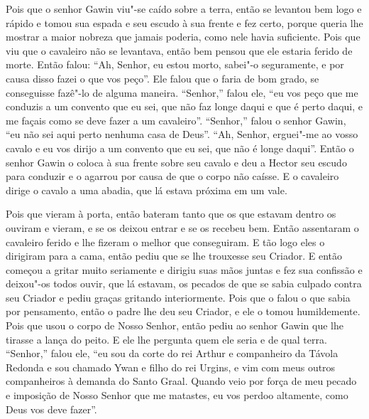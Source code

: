 Pois que o senhor Gawin viu"-se caído sobre a terra, então se levantou bem logo e
rápido e tomou sua espada e seu escudo à sua frente e fez certo, porque queria
lhe mostrar a maior nobreza que jamais poderia, como nele havia suficiente.
Pois que viu que o cavaleiro não se levantava, então bem pensou que ele estaria
ferido de morte. Então falou: “Ah, Senhor, eu estou morto, sabei"-o
seguramente, e por causa disso fazei o que vos peço”. Ele falou que o faria de
bom grado, se conseguisse fazê"-lo de alguma maneira. “Senhor,” falou ele, “eu
vos peço que me conduzis a um convento que eu sei, que não faz longe daqui e
que é perto daqui, e me façais como se deve fazer a um cavaleiro”. “Senhor,”
falou o senhor Gawin, “eu não sei aqui perto nenhuma casa de Deus”. “Ah,
Senhor, erguei"-me ao vosso cavalo e eu vos dirijo a um convento que eu sei, que
não é longe daqui”. Então o senhor Gawin o coloca à sua frente sobre seu cavalo
e deu a Hector seu escudo para conduzir e o agarrou por causa de que o corpo
não caísse. E o cavaleiro dirige o cavalo a uma abadia, que lá estava próxima
em um vale.

Pois que vieram à porta, então bateram tanto que os que estavam dentro os
ouviram e vieram, e se os deixou entrar e se os recebeu bem. Então assentaram o
cavaleiro ferido e lhe fizeram o melhor que conseguiram. E tão logo eles o
dirigiram para a cama, então pediu que se lhe trouxesse seu Criador. E então
começou a gritar muito seriamente e dirigiu suas mãos juntas e fez sua
confissão e deixou"-os todos ouvir, que lá estavam, os pecados de que se sabia
culpado contra seu Criador e pediu graças gritando interiormente. Pois que o
falou o que sabia por pensamento, então o padre lhe deu seu Criador, e ele o
tomou humildemente. Pois que usou o corpo de Nosso Senhor, então pediu ao
senhor Gawin que lhe tirasse a lança do peito. E ele lhe pergunta quem ele
seria e de qual terra. “Senhor,” falou ele, “eu sou da corte do rei Arthur e
companheiro da Távola Redonda e sou chamado Ywan e filho do rei Urgins, e vim
com meus outros companheiros à demanda do Santo Graal. Quando veio por força de
meu pecado e imposição de Nosso Senhor que me matastes, eu vos perdoo
altamente, como Deus vos deve fazer”.

